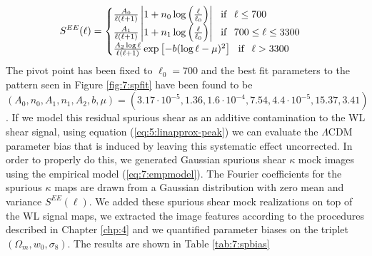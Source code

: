 \begin{equation}
\label{eq:7:empmodel}
S^{EE}(\ell) = 
\begin{cases}
\frac{A_0}{\ell(\ell+1)}\left\vert1+n_0\log\left(\frac{\ell}{\ell_0}\right)\right\vert \,\,\,\,  {\rm if } \,\,\,\, \ell\leq 700 \\
\frac{A_1}{\ell(\ell+1)}\left\vert1+n_1\log\left(\frac{\ell}{\ell_0}\right)\right\vert \,\,\,\,  {\rm if } \,\,\,\, 700\leq\ell\leq 3300 \\
\frac{A_2\log{\ell}}{\ell(\ell+1)}\exp\left[-b(\log{\ell}-\mu)^2\right] \,\,\,\,  {\rm if } \,\,\,\, \ell > 3300
\end{cases} 
\end{equation}
%
The pivot point has been fixed to $\ell_0=700$ and the best fit parameters to the pattern seen in Figure \ref{fig:7:spfit} have been found to be $(A_0,n_0,A_1,n_1,A_2,b,\mu)=(3.17\cdot 10^{-5},1.36,1.6\cdot 10^{-4},7.54,4.4\cdot 10^{-5},15.37,3.41)$. If we model this residual spurious shear as an additive contamination to the WL shear signal, using equation (\ref{eq:5:linapprox-peak}) we can evaluate the $\Lambda$CDM parameter bias that is induced by leaving this systematic effect uncorrected. In order to properly do this, we generated Gaussian spurious shear $\kappa$ mock images using the empirical model (\ref{eq:7:empmodel}). The Fourier coefficients for the spurious $\kappa$ maps are drawn from a Gaussian distribution with zero mean and variance $S^{EE}(\ell)$. We added these spurious shear mock realizations on top of the WL signal maps, we extracted the image features according to the procedures described in Chapter \ref{chp:4} and we quantified parameter biases on the triplet $(\Omega_m,w_0,\sigma_8)$. The results are shown in Table \ref{tab:7:spbias}


